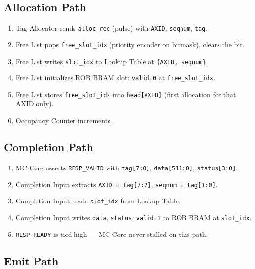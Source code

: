 \subsection{Allocation Path}

\begin{enumerate}[noitemsep]
  \item Tag Allocator sends \texttt{alloc\_req} (pulse) with \texttt{AXID}, \texttt{seqnum}, \texttt{tag}.
  \item Free List pops \texttt{free\_slot\_idx} (priority encoder on bitmask), clears the bit.
  \item Free List writes \texttt{slot\_idx} to Lookup Table at \texttt{\{AXID, seqnum\}}.
  \item Free List initializes ROB BRAM slot: \texttt{valid=0} at \texttt{free\_slot\_idx}.
  \item Free List stores \texttt{free\_slot\_idx} into \texttt{head[AXID]} (first allocation for that AXID only).
  \item Occupancy Counter increments.
\end{enumerate}

\subsection{Completion Path}

\begin{enumerate}[noitemsep]
  \item MC Core asserts \texttt{RESP\_VALID} with \texttt{tag[7:0]}, \texttt{data[511:0]}, \texttt{status[3:0]}.
  \item Completion Input extracts \texttt{AXID = tag[7:2]}, \texttt{seqnum = tag[1:0]}.
  \item Completion Input reads \texttt{slot\_idx} from Lookup Table.
  \item Completion Input writes \texttt{data}, \texttt{status}, \texttt{valid=1} to ROB BRAM at \texttt{slot\_idx}.
  \item \texttt{RESP\_READY} is tied high — MC Core never stalled on this path.
\end{enumerate}

\subsection{Emit Path}

